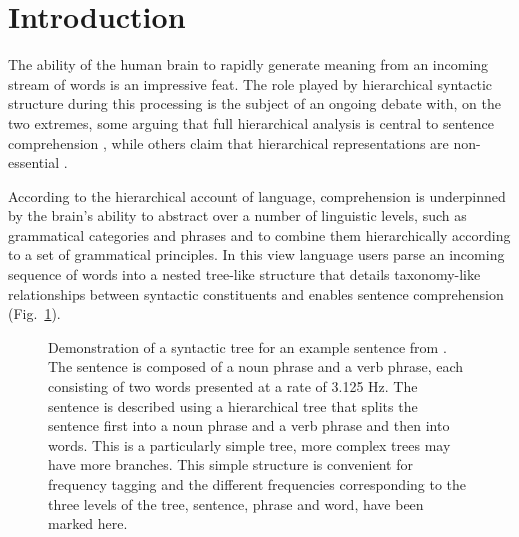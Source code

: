 \documentclass[11pt,a4wide]{article}
\newcommand{\citet}[1]{\cite{#1}}
\begin{document}
\section*{Introduction}

The ability of the human brain to rapidly generate meaning from an
incoming stream of words is an impressive feat. The role played by
hierarchical syntactic structure during this processing is the subject
of an ongoing debate with, on the two extremes, some arguing that full
hierarchical analysis is central to sentence comprehension
\citet{Chomsky1995,BerwickEtAl2013, EveraertEtAl2015}, while others
claim that hierarchical representations are non-essential
\cite{FrankEtAl2012, FrankBod2011, FrankYang2018,
  FrankChristiansen2018}.

According to the hierarchical account of language, comprehension is
underpinned by the brain's ability to abstract over a number of
linguistic levels, such as grammatical categories and phrases and to
combine them hierarchically according to a set of grammatical
principles. In this view language users parse an incoming sequence of
words into a nested tree-like structure that details taxonomy-like
relationships between syntactic constituents and enables sentence
comprehension (Fig.~\ref{fig:freq_tree}).

\begin{figure}[tb]
\begin{center}
\end{center}
\caption{Demonstration of a syntactic tree for an example sentence
  from \cite{DingEtAl2016, DingEtAl2017}. The sentence is composed of
  a noun phrase and a verb phrase, each consisting of two words
  presented at a rate of 3.125 Hz.  The sentence is described using a
  hierarchical tree that splits the sentence first into a noun phrase
  and a verb phrase and then into words. This is a particularly simple
  tree, more complex trees may have more branches. This simple
  structure is convenient for frequency tagging and the different
  frequencies corresponding to the three levels of the tree, sentence,
  phrase and word, have been marked here.}
\label{fig:freq_tree}
\end{figure}
\end{document}
